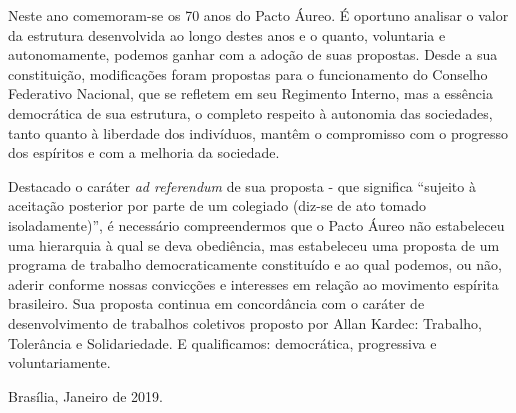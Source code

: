 Neste ano comemoram-se os 70 anos do Pacto Áureo. É oportuno analisar o valor da estrutura desenvolvida ao longo destes anos e o quanto, voluntaria e autonomamente, podemos ganhar com a adoção de suas propostas. Desde a sua constituição, modificações foram propostas para o funcionamento do Conselho Federativo Nacional, que se refletem em seu Regimento Interno, mas a essência democrática de sua estrutura, o completo respeito à autonomia das sociedades, tanto quanto  à liberdade dos indivíduos,  mantêm o compromisso com o progresso dos espíritos e com a melhoria da sociedade.
 
Destacado o caráter \emph{ad referendum} de sua proposta - que significa ``sujeito à aceitação posterior por parte de um colegiado (diz-se de ato tomado isoladamente)'', é necessário compreendermos que o Pacto Áureo não estabeleceu uma hierarquia à qual se deva obediência, mas estabeleceu uma proposta de um programa de trabalho democraticamente constituído e ao qual podemos, ou não, aderir conforme nossas convicções e interesses em relação ao movimento espírita brasileiro. Sua proposta continua em concordância com o caráter de desenvolvimento de trabalhos coletivos proposto por Allan Kardec: Trabalho, Tolerância e Solidariedade. E qualificamos: democrática, progressiva e voluntariamente.  

\vspace{1,2cm}
\hspace{\fill} Brasília, Janeiro de 2019.